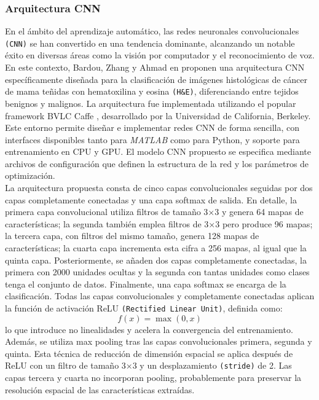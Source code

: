 \documentclass[12pt]{article} %
\begin{document}
\subsubsection{Arquitectura CNN}
En el ámbito del aprendizaje automático, las redes neuronales convolucionales \texttt{(CNN)} se han convertido en una tendencia dominante, alcanzando un notable éxito en diversas áreas como la visión por computador y el reconocimiento de voz. En este contexto, Bardou, Zhang y Ahmad en \cite{bardou2018classification} proponen una arquitectura CNN específicamente diseñada para la clasificación de imágenes histológicas de cáncer de mama teñidas con hematoxilina y eosina \texttt{(H\&E)}, diferenciando entre tejidos benignos y malignos. La arquitectura fue implementada utilizando el popular framework BVLC Caffe \cite{jia2014caffe}, desarrollado por la Universidad de California, Berkeley. Este entorno permite diseñar e implementar redes CNN de forma sencilla, con interfaces disponibles tanto para \textit{MATLAB} como para Python, y soporte para entrenamiento en CPU y GPU. El modelo CNN propuesto se especifica mediante archivos de configuración que definen la estructura de la red y los parámetros de optimización.\\

La arquitectura propuesta consta de cinco capas convolucionales seguidas por dos capas completamente conectadas y una capa softmax de salida. En detalle, la primera capa convolucional utiliza filtros de tamaño 3×3 y genera 64 mapas de características; la segunda también emplea filtros de 3×3 pero produce 96 mapas; la tercera capa, con filtros del mismo tamaño, genera 128 mapas de características; la cuarta capa incrementa esta cifra a 256 mapas, al igual que la quinta capa. Posteriormente, se añaden dos capas completamente conectadas, la primera con 2000 unidades ocultas y la segunda con tantas unidades como clases tenga el conjunto de datos. Finalmente, una capa softmax se encarga de la clasificación. Todas las capas convolucionales y completamente conectadas aplican la función de activación ReLU \texttt{(Rectified Linear Unit)}, definida como: \begin{equation} f(x) = \max(0, x) \end{equation}lo que introduce no linealidades y acelera la convergencia del entrenamiento.\\

Además, se utiliza max pooling tras las capas convolucionales primera, segunda y quinta. Esta técnica de reducción de dimensión espacial se aplica después de ReLU con un filtro de tamaño 3×3 y un desplazamiento \texttt{(stride)} de 2. Las capas tercera y cuarta no incorporan pooling, probablemente para preservar la resolución espacial de las características extraídas. \\
\end{document}
